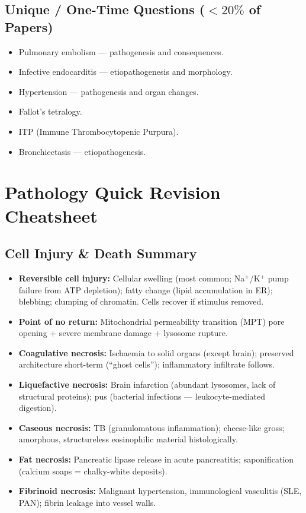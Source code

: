 \documentclass[11pt,a4paper]{article}
\begin{document}
\subsection{Unique / One-Time Questions ($<20\%$ of Papers)}
\begin{itemize}[leftmargin=*]
    \item Pulmonary embolism --- pathogenesis and consequences.
    \item Infective endocarditis --- etiopathogenesis and morphology.
    \item Hypertension --- pathogenesis and organ changes.
    \item Fallot's tetralogy.
    \item ITP (Immune Thrombocytopenic Purpura).
    \item Bronchiectasis --- etiopathogenesis.
\end{itemize}

\newpage
\appendix
\section{Pathology Quick Revision Cheatsheet}

\subsection{Cell Injury \& Death Summary}
\begin{itemize}[leftmargin=*]
    \item \textbf{Reversible cell injury:} Cellular swelling (most common; Na$^+$/K$^+$ pump failure from ATP depletion); fatty change (lipid accumulation in ER); blebbing; clumping of chromatin. Cells recover if stimulus removed.
    \item \textbf{Point of no return:} Mitochondrial permeability transition (MPT) pore opening + severe membrane damage + lysosome rupture.
    \item \textbf{Coagulative necrosis:} Ischaemia to solid organs (except brain); preserved architecture short-term (``ghost cells''); inflammatory infiltrate follows.
    \item \textbf{Liquefactive necrosis:} Brain infarction (abundant lysosomes, lack of structural proteins); pus (bacterial infections --- leukocyte-mediated digestion).
    \item \textbf{Caseous necrosis:} TB (granulomatous inflammation); cheese-like gross; amorphous, structureless eosinophilic material histologically.
    \item \textbf{Fat necrosis:} Pancreatic lipase release in acute pancreatitis; saponification (calcium soaps = chalky-white deposits).
    \item \textbf{Fibrinoid necrosis:} Malignant hypertension, immunological vasculitis (SLE, PAN); fibrin leakage into vessel walls.
\end{itemize}
\end{document}
